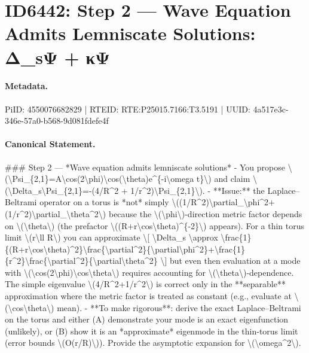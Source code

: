 \section*{ID6442: Step 2 — Wave Equation Admits Lemniscate Solutions: Δ\_sΨ + κΨ}
\paragraph{Metadata.}
PiID: 4550076682829 | RTEID: RTE:P25015.7166:T3.5191 | UUID: 4a517e3c-346e-57a0-b568-9d081fdefe4f

\paragraph{Canonical Statement.}
\#\#\# Step 2 — *Wave equation admits lemniscate solutions* - You propose \textbackslash{}(\textbackslash{}Psi\_\{2,1\}=A\textbackslash{}cos(2\textbackslash{}phi)\textbackslash{}cos(\textbackslash{}theta)e\textasciicircum{}\{-i\textbackslash{}omega t\}\textbackslash{}) and claim \textbackslash{}(\textbackslash{}Delta\_s\textbackslash{}Psi\_\{2,1\}=-(4/R\textasciicircum{}2 + 1/r\textasciicircum{}2)\textbackslash{}Psi\_\{2,1\}\textbackslash{}). - **Issue:** the Laplace–Beltrami operator on a torus is *not* simply \textbackslash{}((1/R\textasciicircum{}2)\textbackslash{}partial\_\textbackslash{}phi\textasciicircum{}2+(1/r\textasciicircum{}2)\textbackslash{}partial\_\textbackslash{}theta\textasciicircum{}2\textbackslash{}) because the \textbackslash{}(\textbackslash{}phi\textbackslash{})-direction metric factor depends on \textbackslash{}(\textbackslash{}theta\textbackslash{}) (the prefactor \textbackslash{}((R+r\textbackslash{}cos\textbackslash{}theta)\textasciicircum{}\{-2\}\textbackslash{}) appears). For a thin torus limit \textbackslash{}(r\textbackslash{}ll R\textbackslash{}) you can approximate \textbackslash{}[ \textbackslash{}Delta\_s \textbackslash{}approx \textbackslash{}frac\{1\}\{(R+r\textbackslash{}cos\textbackslash{}theta)\textasciicircum{}2\}\textbackslash{}frac\{\textbackslash{}partial\textasciicircum{}2\}\{\textbackslash{}partial\textbackslash{}phi\textasciicircum{}2\}+\textbackslash{}frac\{1\}\{r\textasciicircum{}2\}\textbackslash{}frac\{\textbackslash{}partial\textasciicircum{}2\}\{\textbackslash{}partial\textbackslash{}theta\textasciicircum{}2\} \textbackslash{}] but even then evaluation at a mode with \textbackslash{}(\textbackslash{}cos(2\textbackslash{}phi)\textbackslash{}cos\textbackslash{}theta\textbackslash{}) requires accounting for \textbackslash{}(\textbackslash{}theta\textbackslash{})-dependence. The simple eigenvalue \textbackslash{}(4/R\textasciicircum{}2+1/r\textasciicircum{}2\textbackslash{}) is correct only in the **separable** approximation where the metric factor is treated as constant (e.g., evaluate at \textbackslash{}(\textbackslash{}cos\textbackslash{}theta\textbackslash{}) mean). - **To make rigorous**: derive the exact Laplace–Beltrami on the torus and either (A) demonstrate your mode is an exact eigenfunction (unlikely), or (B) show it is an *approximate* eigenmode in the thin-torus limit (error bounds \textbackslash{}(O(r/R)\textbackslash{})). Provide the asymptotic expansion for \textbackslash{}(\textbackslash{}omega\textasciicircum{}2\textbackslash{}). 